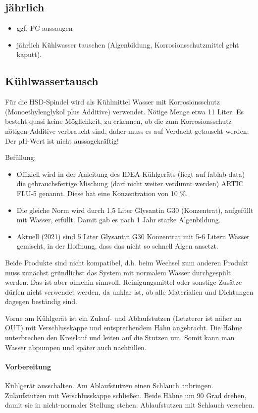 \documentclass{\basedir/fablab-document}
\begin{document}
\subsection{jährlich}
\begin{itemize}
	\item ggf. PC aussaugen
	\item jährlich Kühlwasser tauschen (Algenbildung, Korrosionsschutzmittel geht kaputt).
\end{itemize}

\subsection{Kühlwassertausch}
Für die HSD-Spindel wird als Kühlmittel Wasser mit Korrosionsschutz (Monoethylenglykol plus Additive) verwendet. Nötige Menge etwa 11 Liter. Es besteht quasi keine Möglichkeit, zu erkennen, ob die zum Korrosionsschutz nötigen Additive verbraucht sind, daher muss es auf Verdacht getauscht werden. Der pH-Wert ist nicht aussagekräftig!

Befüllung:
\begin{itemize}
	\item Offiziell wird in der Anleitung des IDEA-Kühlgeräts (liegt auf fablab-data) die gebrauchsfertige Mischung (darf nicht weiter verdünnt werden) ARTIC FLU-5 genannt. Diese hat eine Konzentration von 10 \%.
	\item Die gleiche Norm wird durch 1,5 Liter Glysantin G30 (Konzentrat), aufgefüllt mit Wasser, erfüllt. Damit gab es nach 1 Jahr starke Algenbildung.
	\item Aktuell (2021) sind 5 Liter Glysantin G30 Konzentrat mit 5-6 Litern Wasser gemischt, in der Hoffnung, dass das nicht so schnell Algen ansetzt.
\end{itemize}
Beide Produkte sind nicht kompatibel, d.h. beim Wechsel zum anderen Produkt muss zunächst gründlichst das System mit normalem Wasser durchgespült werden. Das ist aber ohnehin sinnvoll. Reinigungsmittel oder sonstige Zusätze dürfen nicht verwendet werden, da unklar ist, ob alle Materialien und Dichtungen dagegen beständig sind.

Vorne am Kühlgerät ist ein Zulauf- und Ablaufstutzen (Letzterer ist näher an OUT) mit Verschlusskappe und entsprechendem Hahn angebracht. Die Hähne unterbrechen den Kreislauf und leiten auf die Stutzen um. Somit kann man Wasser abpumpen und später auch nachfüllen.

\paragraph{Vorbereitung} Kühlgerät ausschalten. Am Ablaufstutzen einen Schlauch anbringen. Zulaufstutzen mit Verschlusskappe schließen. Beide Hähne um 90 Grad drehen, damit sie in nicht-normaler Stellung stehen. Ablaufstutzen mit Schlauch versehen.
\end{document}
